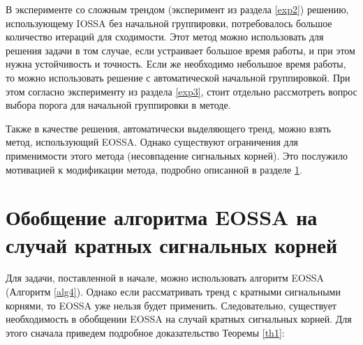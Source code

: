 \documentclass[specialist, substylefile = spbureport.rtx, subf,href,colorlinks=true, 12pt]{disser}
\theoremstyle{definition}
\begin{document}
В эксперименте со сложным трендом (эксперимент из раздела \ref{exp2}) решению, использующему IOSSA без начальной группировки, потребовалось большое количество итераций для сходимости. Этот метод можно использовать для решения задачи в том случае, если устраивает большое время работы, и при этом нужна устойчивость и точность. Если же необходимо небольшое время работы, то можно использовать решение с автоматической начальной группировкой. При этом согласно эксперименту из раздела \ref{exp3}, стоит отдельно рассмотреть вопрос выбора порога для начальной группировки в методе.

Также в качестве решения, автоматически выделяющего тренд, можно взять метод, использующий EOSSA. Однако существуют ограничения для применимости этого метода (несовпадение сигнальных корней). Это послужило мотивацией к модификации метода, подробно описанной в разделе \ref{ch3}.

\chapter{Обобщение алгоритма EOSSA на случай кратных сигнальных корней}
\label{ch3}
Для задачи, поставленной в начале, можно использовать алгоритм EOSSA (Алгоритм \ref{alg4}). Однако если рассматривать тренд с кратными сигнальными корнями, то EOSSA уже нельзя будет применить. Следовательно, существует необходимость в обобщении EOSSA на случай кратных сигнальных корней. Для этого сначала приведем подробное доказательство Теоремы \ref{th1}:
\end{document}
